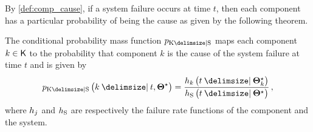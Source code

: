 \documentclass[
    11pt,
    extrafontsizes,
    article,
    oldfontcommands,
    final,
    oneside,
    openany,
    hidelinks]{memoir}
\begin{document}
By \cref{def:comp_cause}, if a system failure occurs at time $t$, then each component has a particular probability of being the cause as given by the following theorem.
\begin{theorem}
\label{def:general_cond_prob}
The conditional probability mass function $\pmf_{\RV{K} \Given \sv}$ maps each component $k \in \Set{K}$ to the probability that 
component $k$ is the cause of the system failure at time $t$ and is given by
\begin{equation}
\label{eq:general_cond_prob_failure_rate}
    \pmf_{\RV{K} \Given \sv}\left(k \Given t, \tparam{\sysparam}\right) = \frac{\haz_k\left(t \Given \tparam{\sysparam}_k\right)}{\haz_{\sv}\left(t \Given \tparam{\sysparam}\right)}\,,
\end{equation}
where $h_j$ and $h_{\mathrm{S}}$ are respectively the failure rate functions of 
the \jth component and the system.
\end{theorem}
\end{document}
